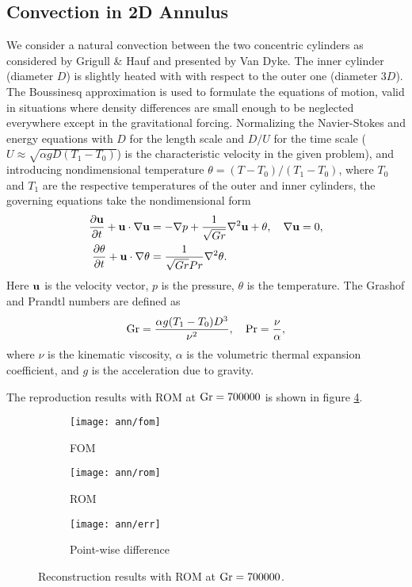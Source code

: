 \subsection{Convection in 2D Annulus}
We consider a natural convection between the two concentric cylinders as
considered by Grigull \& Hauf and presented by Van Dyke. The inner cylinder
(diameter $D$) is slightly heated with with respect to the outer one (diameter
$3D$). The Boussinesq approximation is used to formulate the equations of
motion, valid in situations where density differences are small enough to be
neglected everywhere except in the gravitational forcing.  
Normalizing the Navier-Stokes and energy equations with $D$ for the length
scale and $D/U$ for the time scale ($U \approx \sqrt{\alpha g D (T_1-T_0)}$) is
the characteristic velocity in the given problem), and introducing
nondimensional temperature $\theta=(T-T_0)/(T_1-T_0)$, where $T_0$ and $T_1$
are the respective temperatures of the outer and inner cylinders, the governing
equations take the nondimensional form
\begin{align}
   \frac{\partial {\bf u}}{\partial t} + {\bf u} \cdot \nabla {\bf u} & = -\nabla p + \frac{1}{\sqrt{Gr}}
\nabla^2 {\bf u} + \theta, \quad \nabla {\bf u} = 0, \\ \frac{\partial \theta}{\partial t} + {\bf u} \cdot
\nabla \theta & = \frac{1}{\sqrt{Gr}Pr} \nabla^2 \theta.
\end{align}
Here ${\bf u}$ is the velocity vector, $p$ is the pressure, $\theta$ is the
temperature.  The Grashof and Prandtl numbers are defined as
\begin{equation}
   {\rm Gr} = \frac{\alpha g (T_1-T_0) D^3}{\nu^2}, \quad {\rm Pr} =
\frac{\nu}{\alpha},
\end{equation}
where $\nu$ is the kinematic viscosity, $\alpha$ is the volumetric thermal
expansion coefficient, and $g$ is the acceleration due to gravity. 

The reproduction results with ROM at $\rm Gr=700000$ is shown in figure \ref{fig:4}.
\begin{figure}[!h]
     \centering
     \begin{subfigure}[b]{0.3\textwidth}
         \centering
         \texttt{[image: ann/fom]}
         \caption{FOM}
         \label{fig:4_a}
     \end{subfigure}
     \begin{subfigure}[b]{0.3\textwidth}
         \centering
         \texttt{[image: ann/rom]}
         \caption{ROM}
         \label{fig:4_b}
     \end{subfigure}
     \begin{subfigure}[b]{0.3\textwidth}
         \centering
         \texttt{[image: ann/err]}
         \caption{Point-wise difference}
         \label{fig:4_c}
     \end{subfigure}
     \caption{Reconstruction results with ROM at $\rm Gr=700000$.} \label{fig:4}
\end{figure}

